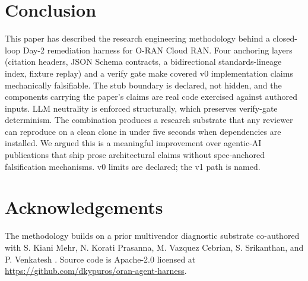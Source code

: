 \documentclass[twocolumn,10pt,a4paper]{article}
\begin{document}
\section{Conclusion}
\label{sec:conclude}

This paper has described the research engineering methodology behind a closed-loop Day-2 remediation harness for O-RAN Cloud RAN. Four anchoring layers (citation headers, JSON Schema contracts, a bidirectional standards-lineage index, fixture replay) and a verify gate make covered v0 implementation claims mechanically falsifiable. The stub boundary is declared, not hidden, and the components carrying the paper's claims are real code exercised against authored inputs. LLM neutrality is enforced structurally, which preserves verify-gate determinism. The combination produces a research substrate that any reviewer can reproduce on a clean clone in under five seconds when dependencies are installed. We argued this is a meaningful improvement over agentic-AI publications that ship prose architectural claims without spec-anchored falsification mechanisms. v0 limits are declared; the v1 path is named.

\section*{Acknowledgements}

The methodology builds on a prior multivendor diagnostic substrate co-authored with S. Kiani Mehr, N. Korati Prasanna, M. Vazquez Cebrian, S. Srikanthan, and P. Venkatesh \cite{multivendor_blog_2026}. Source code is Apache-2.0 licensed at \url{https://github.com/dkypuros/oran-agent-harness}.



\end{document}
